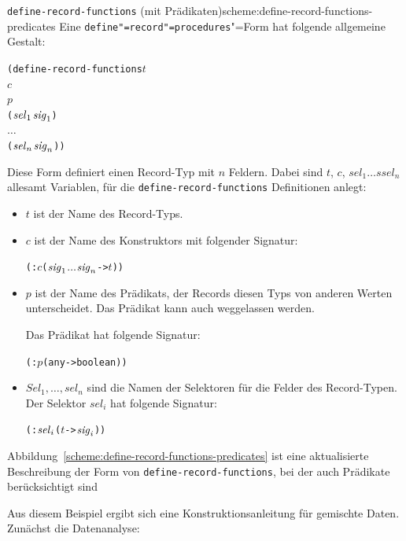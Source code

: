 \begin{feature}{\texttt{define-record-functions} (mit Prädikaten)}{scheme:define-record-functions-predicates}
Eine \texttt{define"=record"=procedures}"=Form
hat folgende allgemeine Gestalt:\label{def:define-record-functions}
%
\begin{alltt}
(define-record-functions \(t\)
  \(c\)
  \(p\)
  (\(\mathit{sel}\sb{1}\) \(\mathit{sig}\sb{1}\))
  \(\ldots\)
  (\(\mathit{sel}\sb{n}\) \(\mathit{sig}\sb{n}\)))
\end{alltt}
%
Diese Form definiert einen Record-Typ mit $n$ Feldern.
Dabei sind $t$, $c$, $\mathit{sel}_1 \ldots \mathit{ssel}_n$ allesamt Variablen, für die
\texttt{define-record-functions} Definitionen anlegt:
%
\begin{itemize}
\item $t$ ist der Name des Record-Typs.
\item $c$ ist der Name des Konstruktors mit 
  folgender Signatur:
%  
\begin{alltt}
(: \(c\) (\(\mathit{sig}\sb{1}\) \(\ldots\) \(\mathit{sig}\sb{n}\) -> \(t\)))
\end{alltt}
\item $p$ ist der Name des Prädikats, der Records diesen Typs von
  anderen Werten unterscheidet.  Das Prädikat kann auch weggelassen
  werden.

    Das Prädikat hat folgende Signatur:
\begin{alltt}
(: \(p\) (any -> boolean))
\end{alltt}
\item $\mathit{Sel}_1, \ldots, \mathit{sel}_n$ sind die Namen der Selektoren für die Felder
  des Record-Typen.  Der Selektor $\mathit{sel}_i$ hat folgende Signatur:
% 
\begin{alltt}
(: \(\mathit{sel}\sb{i}\) (\(t\) -> \(\mathit{sig}\sb{i}\)))
\end{alltt}
\end{itemize}
%
\end{feature}
%
Abbildung~\ref{scheme:define-record-functions-predicates} ist eine
aktualisierte Beschreibung der Form von
\texttt{define-record-functions}, bei der auch Prädikate
berücksichtigt sind

Aus diesem Beispiel ergibt sich eine Konstruktionsanleitung für
gemischte Daten.  Zunächst die Datenanalyse:

